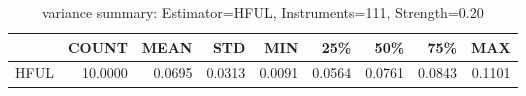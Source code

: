 \begin{table}[ht]
\centering
\caption{variance summary: Estimator=HFUL, Instruments=111, Strength=0.20}
\begin{tabular}{lrrrrrrrr}
\toprule
 & COUNT & MEAN & STD & MIN & 25\% & 50\% & 75\% & MAX \\
\midrule
HFUL & 10.0000 & 0.0695 & 0.0313 & 0.0091 & 0.0564 & 0.0761 & 0.0843 & 0.1101 \\
\bottomrule
\end{tabular}
\end{table}
